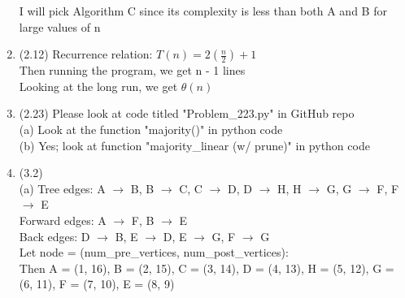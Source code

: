 \documentclass{article}
\begin{document}
\begin{enumerate}
			I will pick Algorithm C since its complexity is less than both A and B for large values of n
			\\
			
		\item
			(2.12) Recurrence relation: $T(n) = 2(\frac{n}{2}) + 1$ \\
			Then running the program, we get n - 1 lines \\
			Looking at the long run, we get $\theta(n)$
			\\
			
		\item
			(2.23) Please look at code titled "Problem\_223.py" in GitHub repo \\
			(a) Look at the function "majority()" in python code\\
			(b) Yes; look at function "majority\_linear (w/ prune)" in python code
			\\
			
		\item
			(3.2) 
			\\
			(a) Tree edges:
			A $\rightarrow$ B, B $\rightarrow$ C, C $\rightarrow$ D, D $\rightarrow$ H, H $\rightarrow$ G, G $\rightarrow$ F, F $\rightarrow$ E \\
			Forward edges:  A $\rightarrow$ F, B $\rightarrow$ E\\
			Back edges:  D $\rightarrow$ B, E $\rightarrow$ D, E $\rightarrow$ G, F $\rightarrow$ G\\
			Let node = (num\_pre\_vertices, num\_post\_vertices): \\
			Then A = (1, 16), B = (2, 15), C = (3, 14), D = (4, 13), H = (5, 12), G = (6, 11), F = (7, 10), E = (8, 9)
			\\
		

\end{enumerate}
\end{document}
